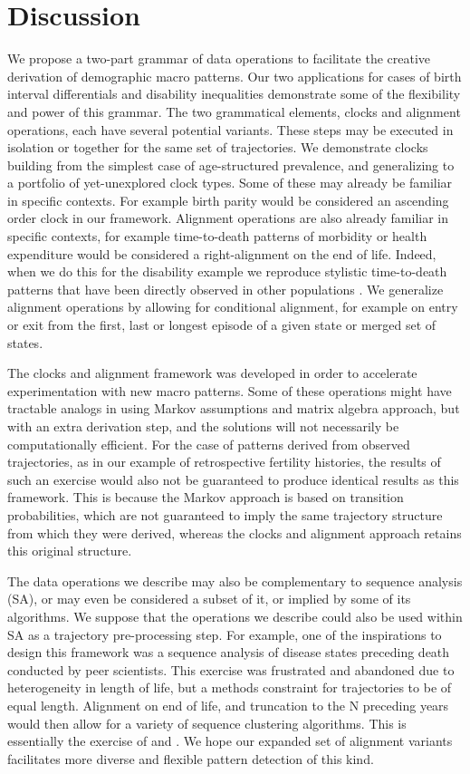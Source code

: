 \documentclass{article}
\begin{document}
\section{Discussion}

We propose a two-part grammar of data operations to facilitate the creative derivation of demographic macro patterns. Our two applications for cases of birth interval differentials and disability inequalities demonstrate some of the flexibility and power of this grammar. The two grammatical elements, clocks and alignment operations, each have several potential variants. These steps may be executed in isolation or together for the same set of trajectories. We demonstrate clocks building from the simplest case of age-structured prevalence, and generalizing to a portfolio of yet-unexplored clock types. Some of these may already be familiar in specific contexts. For example birth parity would be considered an ascending order clock in our framework. Alignment operations are also already familiar in specific contexts, for example time-to-death patterns of morbidity or health expenditure would be considered a right-alignment on the end of life. Indeed, when we do this for the disability example we reproduce stylistic time-to-death patterns that have been directly observed in other populations \citep{klijs2010disability, riffe2016time}. We generalize alignment operations by allowing for conditional alignment, for example on entry or exit from the first, last or longest episode of a given state or merged set of states.

The clocks and alignment framework was developed in order to accelerate experimentation with new macro patterns. Some of these operations might have tractable analogs in using Markov assumptions and matrix algebra approach, but with an extra derivation step, and the solutions will not necessarily be computationally efficient. For the case of patterns derived from observed trajectories, as in our example of retrospective fertility histories, the results of such an exercise would also not be guaranteed to produce identical results as this framework. This is because the Markov approach is based on transition probabilities, which are not guaranteed to imply the same trajectory structure from which they were derived, whereas the clocks and alignment approach retains this original structure. 

The data operations we describe may also be complementary to sequence analysis (SA), or may even be considered a subset of it, or implied by some of its algorithms. We suppose that the operations we describe could also be used within SA as a trajectory pre-processing step. For example, one of the inspirations to design this framework was a sequence analysis of disease states preceding death conducted by peer scientists. This exercise was frustrated and abandoned due to heterogeneity in length of life, but a methods constraint for trajectories to be of equal length. Alignment on end of life, and truncation to the N preceding years would then allow for a variety of sequence clustering algorithms. This is essentially the exercise of \citet{potente2018disability} and \citet{raab2018pathways}. We hope our expanded set of alignment variants facilitates more diverse and flexible pattern detection of this kind.
\end{document}
